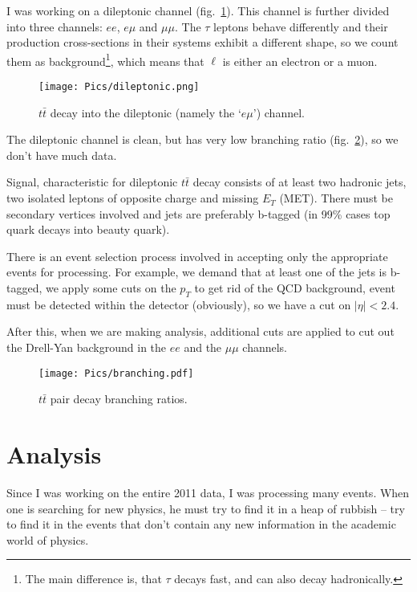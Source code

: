\documentclass[a4paper, 12 pt, titlepage, twocolumn]{article}
\newcommand{\ttbar}{
	\ensuremath{t\bar{t}}
}
\begin{document}
I was working on a dileptonic channel (fig.~\ref{fig:dileptonic}). This channel is further divided into three channels:
$ee$, $e\mu$ and $\mu\mu$. The $\tau$ leptons behave differently and their production cross-sections in their systems
exhibit a different shape, so we count them as background\footnote{The main difference is, that $\tau$ decays fast, and
can also decay hadronically.}, which means that $\ell$ is either an electron or a muon.

\begin{figure}[H]
	\centering
	\texttt{[image: Pics/dileptonic.png]}
	\caption{$\ttbar$ decay into the dileptonic (namely the `$e\mu$') channel.}
	\label{fig:dileptonic}
\end{figure}

The dileptonic channel is clean, but has very low branching ratio (fig.~\ref{fig:branching}), so we don't
have much data.

Signal, characteristic for dileptonic $\ttbar$ decay consists of at least two hadronic jets, two isolated
leptons of opposite charge and missing $E_T$ (MET). There must be secondary vertices involved and jets are
preferably b-tagged
(in 99\% cases top quark decays into beauty quark).

There is an event selection process involved in accepting only the appropriate events for processing. For
example, we demand that at least one of the jets is b-tagged, we apply some cuts on the $p_T$ to get rid of
the QCD background, event must be detected within the detector (obviously), so we have a cut on $|\eta| < 2.4$.

After this, when we are making analysis, additional cuts are applied to cut out the Drell-Yan background in the
$ee$ and the $\mu\mu$ channels.

\begin{figure}[H]
	\centering
	\texttt{[image: Pics/branching.pdf]}
	\caption{$\ttbar$ pair decay branching ratios.}
	\label{fig:branching}
	\vspace{-18pt}
\end{figure}

\section{Analysis}

Since I was working on the entire 2011 data, I was processing many events. When one is searching for new
physics, he must try to find it in a heap of rubbish -- try to find it in the events that don't contain
any new information in the academic world of physics.
\end{document}
